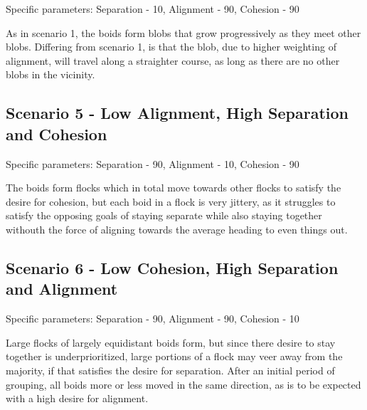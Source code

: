 \documentclass[twoside]{article}
\begin{document}
\begin{multicols}{2}
    Specific parameters: Separation - 10, Alignment - 90, Cohesion - 90

    As in scenario 1, the boids form blobs that grow progressively as they meet other blobs. 
    Differing from scenario 1, is that the blob, due to higher weighting of alignment, will travel along a straighter course, as long as there are no other blobs in the vicinity.

    \subsection{Scenario 5 - Low Alignment, High Separation and Cohesion}

    Specific parameters: Separation - 90, Alignment - 10, Cohesion - 90

    The boids form flocks which in total move towards other flocks to satisfy the desire for cohesion, but each boid in a flock is very jittery, as it struggles to satisfy the opposing goals of staying separate while also staying together withouth the force of aligning towards the average heading to even things out.

    \subsection{Scenario 6 - Low Cohesion, High Separation and Alignment}

    Specific parameters: Separation - 90, Alignment - 90, Cohesion - 10

    Large flocks of largely equidistant boids form, but since there desire to stay together is underprioritized, large portions of a flock may veer away from the majority, if that satisfies the desire for separation.
    After an initial period of grouping, all boids more or less moved in the same direction, as is to be expected with a high desire for alignment.


\end{multicols}



\end{document}
